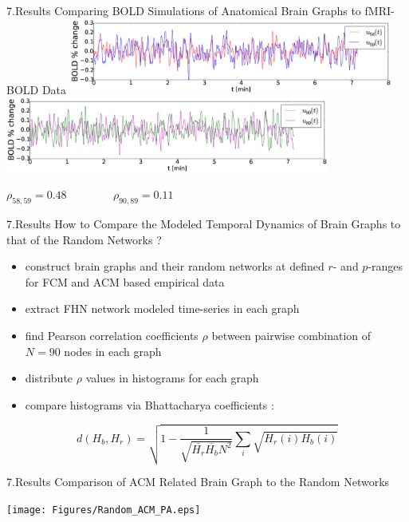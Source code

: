 \documentclass{beamer}
\begin{document}
\begin{frame}{7.Results}
\footnotesize{Comparing BOLD Simulations of Anatomical Brain Graphs to fMRI-BOLD Data} 
\break
\break
	\centering
	 \includegraphics[width=0.8\textwidth]{Figures/cor_BOLD_ACM_sim_no_best.eps} \\
   	 \includegraphics[width=0.8\textwidth]{Figures/cor_BOLD_ACM_sim_no_worst.eps} 

  \tiny{ $\rho_{58,59}=0.48$ ~~~~~~~ $\rho_{90,89}=0.11$ }
\end{frame}





\begin{frame}{7.Results}
\footnotesize{How to Compare the Modeled Temporal Dynamics of Brain Graphs to that of the Random Networks ? }

\begin{itemize}
  \item construct brain graphs and their random networks at defined $r$- and $p$-ranges for FCM and ACM based empirical data  
  \item extract FHN network modeled time-series in each graph
  \item find Pearson correlation coefficients $\rho$ between pairwise combination of $N=90$ nodes in each graph
  \item distribute $\rho$ values in histograms for each graph
  \item compare histograms via Bhattacharya coefficients :
    \end{itemize}
\begin{equation}
d(H_b, H_r) = \sqrt{1- \dfrac{1}{ \sqrt{\bar{H_r} \bar{H_b} N^2}} \sum_{i} \sqrt{H_r(i)H_b(i)} } 
\end{equation}

\end{frame}




\begin{frame}{7.Results}
\footnotesize{Comparison of ACM Related Brain Graph to the Random Networks}

\texttt{[image: Figures/Random\_ACM\_PA.eps]}

\end{frame}
\end{document}
